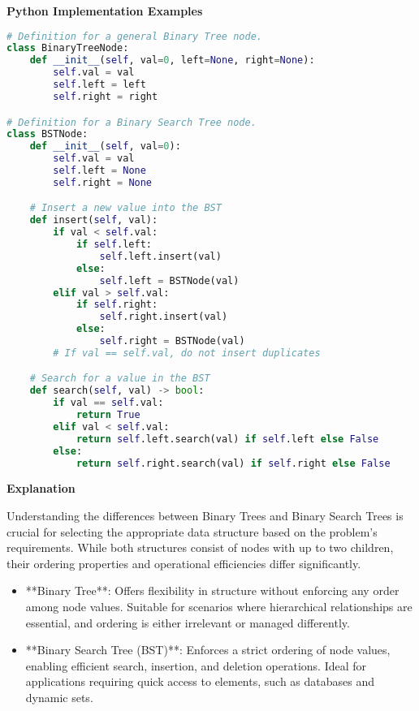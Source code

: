 \textbf{Python Implementation Examples}

\begin{lstlisting}[language=Python, xleftmargin=0.02\textwidth, xrightmargin=0.02\textwidth]
# Definition for a general Binary Tree node.
class BinaryTreeNode:
    def __init__(self, val=0, left=None, right=None):
        self.val = val
        self.left = left
        self.right = right

# Definition for a Binary Search Tree node.
class BSTNode:
    def __init__(self, val=0):
        self.val = val
        self.left = None
        self.right = None

    # Insert a new value into the BST
    def insert(self, val):
        if val < self.val:
            if self.left:
                self.left.insert(val)
            else:
                self.left = BSTNode(val)
        elif val > self.val:
            if self.right:
                self.right.insert(val)
            else:
                self.right = BSTNode(val)
        # If val == self.val, do not insert duplicates

    # Search for a value in the BST
    def search(self, val) -> bool:
        if val == self.val:
            return True
        elif val < self.val:
            return self.left.search(val) if self.left else False
        else:
            return self.right.search(val) if self.right else False
\end{lstlisting}

\textbf{Explanation}

Understanding the differences between Binary Trees and Binary Search Trees is crucial for selecting the appropriate data structure based on the problem's requirements. While both structures consist of nodes with up to two children, their ordering properties and operational efficiencies differ significantly.

\begin{itemize}
    \item **Binary Tree**: Offers flexibility in structure without enforcing any order among node values. Suitable for scenarios where hierarchical relationships are essential, and ordering is either irrelevant or managed differently.
    
    \item **Binary Search Tree (BST)**: Enforces a strict ordering of node values, enabling efficient search, insertion, and deletion operations. Ideal for applications requiring quick access to elements, such as databases and dynamic sets.
\end{itemize}

